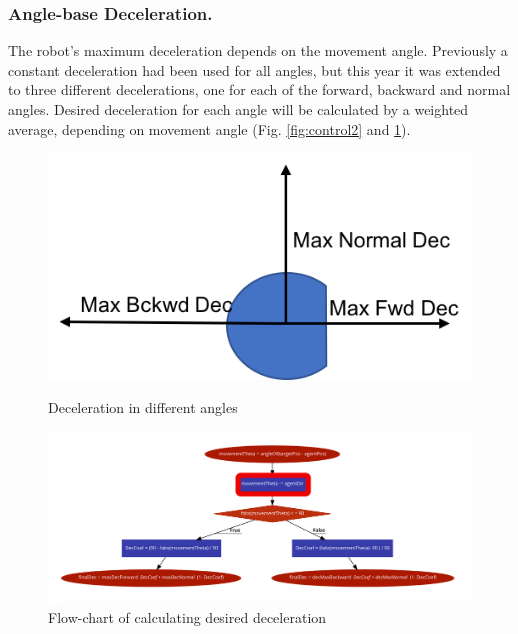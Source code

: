 \documentclass{llncs}
\begin{document}
\subsubsection{Angle-base Deceleration.}
\label{subsubsec:AngleBaseDeceleration}
The robot’s maximum deceleration depends on the movement angle. Previously a constant deceleration had been used for all angles, but this year it was extended to three different decelerations, one for each of the forward, backward and normal angles. Desired deceleration for each angle will be calculated by a weighted average, depending on movement angle (Fig. \ref{fig:control2} and  \ref{fig:control3}).
\begin{figure}
\centering
\includegraphics[width=.5\linewidth]{img/f2}
\caption{Deceleration in different angles}
\label{fig:control2}
\centering
\centering
\includegraphics[width=\linewidth]{img/f3}
\caption{Flow-chart of calculating desired deceleration}
\label{fig:control3}
\end{figure}
\end{document}
